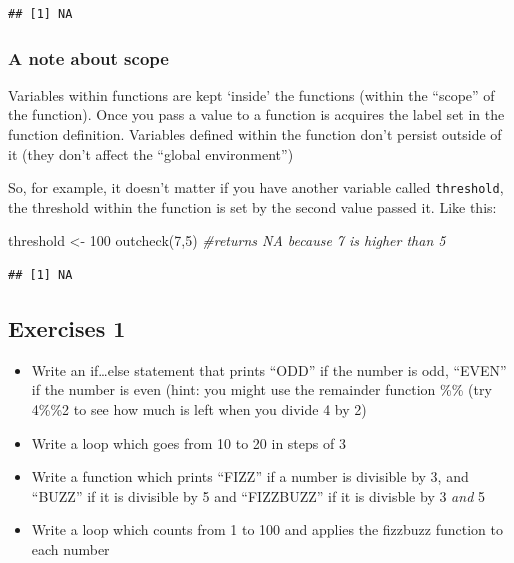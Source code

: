 \documentclass[
  12pt,
  a5paper,
]{book}
\newenvironment{Shaded}{\begin{snugshade}}{\end{snugshade}}
\newcommand{\CommentTok}[1]{\textcolor[rgb]{0.56,0.35,0.01}{\textit{#1}}}
\newcommand{\DecValTok}[1]{\textcolor[rgb]{0.00,0.00,0.81}{#1}}
\newcommand{\FunctionTok}[1]{\textcolor[rgb]{0.00,0.00,0.00}{#1}}
\newcommand{\NormalTok}[1]{#1}
\newcommand{\OtherTok}[1]{\textcolor[rgb]{0.56,0.35,0.01}{#1}}
\providecommand{\tightlist}{%
  \setlength{\itemsep}{0pt}\setlength{\parskip}{0pt}}
\begin{document}
\begin{verbatim}
## [1] NA
\end{verbatim}

\hypertarget{a-note-about-scope}{%
\subsubsection{A note about scope}\label{a-note-about-scope}}

Variables within functions are kept `inside' the functions (within the ``scope'' of the function). Once you pass a value to a function is acquires the label set in the function definition. Variables defined within the function don't persist outside of it (they don't affect the ``global environment'')

So, for example, it doesn't matter if you have another variable called \texttt{threshold}, the threshold within the function is set by the second value passed it. Like this:

\begin{Shaded}
\begin{Highlighting}[]
\NormalTok{threshold }\OtherTok{\textless{}{-}} \DecValTok{100}
\FunctionTok{outcheck}\NormalTok{(}\DecValTok{7}\NormalTok{,}\DecValTok{5}\NormalTok{) }\CommentTok{\#returns NA because 7 is higher than 5}
\end{Highlighting}
\end{Shaded}

\begin{verbatim}
## [1] NA
\end{verbatim}

\hypertarget{exercises-1-1}{%
\subsection{Exercises 1}\label{exercises-1-1}}

\begin{itemize}
\tightlist
\item
  Write an if\ldots else statement that prints ``ODD'' if the number is odd, ``EVEN'' if the number is even (hint: you might use the remainder function \%\% (try 4\%\%2 to see how much is left when you divide 4 by 2)
\item
  Write a loop which goes from 10 to 20 in steps of 3
\item
  Write a function which prints ``FIZZ'' if a number is divisible by 3, and ``BUZZ'' if it is divisible by 5 and ``FIZZBUZZ'' if it is divisble by 3 \emph{and} 5
\item
  Write a loop which counts from 1 to 100 and applies the fizzbuzz function to each number
\end{itemize}
\end{document}
